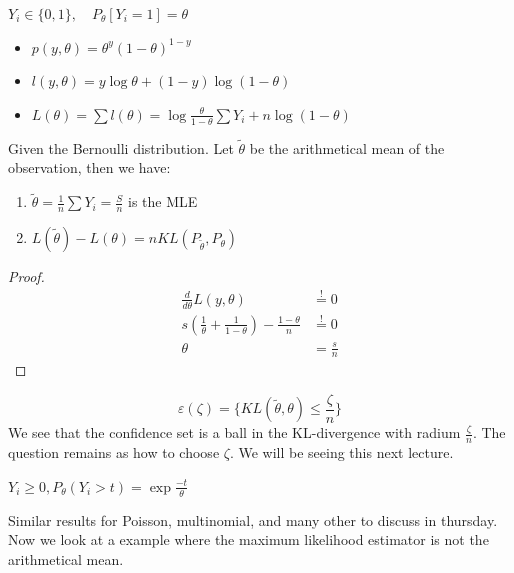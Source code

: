 \begin{example}[Bernoulli]
	$Y_i \in \{0, 1\}, \quad P_\theta[Y_i = 1] = \theta $
	\begin{itemize}
		\item $p(y, \theta) = \theta^y (1-\theta)^{1-y}$
		\item $l(y, \theta) = y \log \theta + (1 - y) \log(1 - \theta)$
		\item $L(\theta) = \sum l(\theta) = \log \frac{\theta}{1 - \theta} \sum Y_i + n\log (1 - \theta)$
	\end{itemize}
\end{example}

\begin{lemma}
Given the Bernoulli distribution. Let $\tilde{\theta}$ be the arithmetical mean of the observation, then we have:
\begin{enumerate}
	\item $\tilde{\theta} = \frac{1}{n} \sum Y_i = \frac{S}{n}$ is the MLE
	\item $L(\tilde{\theta}) - L(\theta) = nKL(P_{\tilde{\theta}}, P_\theta)$
\end{enumerate}
\end{lemma}

\begin{proof}
	\begin{align*}
			\frac{d}{d\theta} L(y, \theta) &\overset{!}{=} 0\\
			s(\frac{1}{\theta} + \frac{1}{1 - \theta}) - \frac{1 - \theta}{n} &\overset{!}{=} 0\\
			\theta &= \frac{s}{n}
	\end{align*}
\end{proof}


\begin{corollary}
\begin{equation*}
		\varepsilon(\zeta) = \{KL(\tilde{\theta}, \theta) \leq \frac{\zeta}{n} \}
\end{equation*}
We see that the confidence set is a ball in the KL-divergence with radium $\frac{\zeta}{n}$. 
The question remains as how to choose $\zeta$. We will be seeing this next lecture. 
\end{corollary}

\begin{example}
	$Y_i \geq 0, P_\theta(Y_i > t) = \exp{\frac{-t}{\theta}}$
\end{example}


Similar results for Poisson, multinomial, and many other to discuss in thursday. Now we look at a example where the maximum likelihood estimator is not the arithmetical mean.

